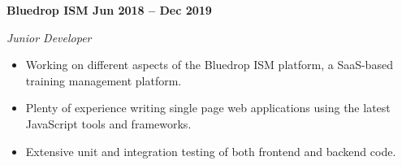 \vspace{0.1cm}
\textbf{Bluedrop ISM \hfill Jun 2018 -- Dec 2019} \par
\textit{Junior Developer} \par
\begin{itemize}
	\item Working on different aspects of the Bluedrop ISM platform, a SaaS-based training management platform.
    \item Plenty of experience writing single page web applications using the latest JavaScript tools and frameworks.
    \item Extensive unit and integration testing of both frontend and backend code.
\end{itemize} \par